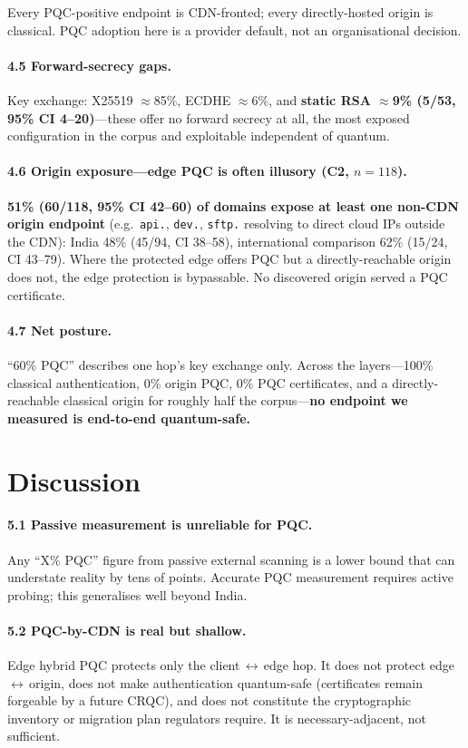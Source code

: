 \documentclass[11pt]{article}
\begin{document}
\noindent
Every PQC-positive endpoint is CDN-fronted; every directly-hosted origin is classical. PQC
adoption here is a provider default, not an organisational decision.

\paragraph{4.5 Forward-secrecy gaps.} Key exchange: X25519 $\approx$85\%, ECDHE $\approx$6\%, and
\textbf{static RSA $\approx$9\% (5/53, 95\% CI 4--20)}---these offer no forward secrecy at all, the
most exposed configuration in the corpus and exploitable independent of quantum.

\paragraph{4.6 Origin exposure---edge PQC is often illusory (C2, $n = 118$).} \textbf{51\% (60/118,
95\% CI 42--60) of domains expose at least one non-CDN origin endpoint} (e.g.\ \texttt{api.},
\texttt{dev.}, \texttt{sftp.} resolving to direct cloud IPs outside the CDN): India 48\% (45/94,
CI 38--58), international comparison 62\% (15/24, CI 43--79). Where the protected edge offers PQC
but a directly-reachable origin does not, the edge protection is bypassable. No discovered origin
served a PQC certificate.

\paragraph{4.7 Net posture.} ``60\% PQC'' describes one hop's key exchange only. Across the
layers---100\% classical authentication, 0\% origin PQC, 0\% PQC certificates, and a
directly-reachable classical origin for roughly half the corpus---\textbf{no endpoint we measured
is end-to-end quantum-safe.}

\section{Discussion}

\paragraph{5.1 Passive measurement is unreliable for PQC.} Any ``X\% PQC'' figure from passive
external scanning is a lower bound that can understate reality by tens of points. Accurate PQC
measurement requires active probing; this generalises well beyond India.

\paragraph{5.2 PQC-by-CDN is real but shallow.} Edge hybrid PQC protects only the
client\,$\leftrightarrow$\,edge hop. It does not protect edge\,$\leftrightarrow$\,origin, does not
make authentication quantum-safe (certificates remain forgeable by a future CRQC), and does not
constitute the cryptographic inventory or migration plan regulators require. It is
necessary-adjacent, not sufficient.
\end{document}
